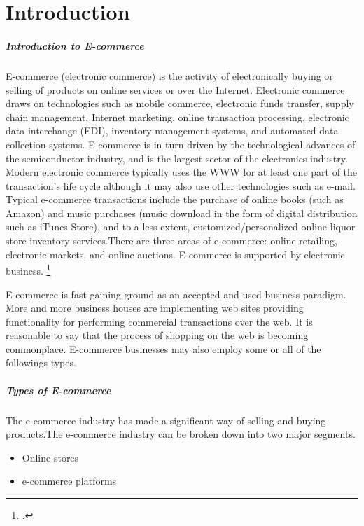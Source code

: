 \chapter{Introduction}
\paragraph{Introduction to E-commerce}
E-commerce (electronic commerce) is the activity of electronically buying or selling of products on online services or over the Internet. Electronic commerce draws on technologies such as mobile commerce, electronic funds transfer, supply chain management, Internet marketing, online transaction processing, electronic data interchange (EDI), inventory management systems, and automated data collection systems. E-commerce is in turn driven by the technological advances of the semiconductor industry, and is the largest sector of the electronics industry. Modern electronic commerce typically uses the WWW for at least one part of the transaction's life cycle although it may also use other technologies such as e-mail. Typical e-commerce transactions include the purchase of online books (such as Amazon) and music purchases (music download in the form of digital distribution such as iTunes Store), and to a less extent, customized/personalized online liquor store inventory services.There are three areas of e-commerce: online retailing, electronic markets, and online auctions. E-commerce is supported by electronic business. \footcite{wikiecommerce}

E-commerce is fast gaining ground as an accepted and used business paradigm. More and more business houses are implementing web sites providing functionality for performing commercial transactions over the web. It is reasonable to say that the process of shopping on the web is becoming commonplace. E-commerce businesses may also employ some or all of the followings types.
\paragraph{Types of E-commerce} 
The e-commerce industry has made a significant way of selling and buying products.The e-commerce industry can be broken down into two major segments.
	\begin{itemize}
		\item Online stores 
		\item e-commerce platforms
	\end{itemize}
	
